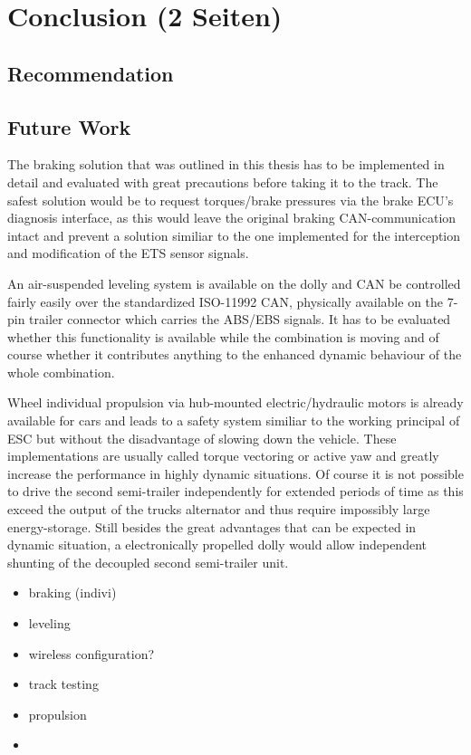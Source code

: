 \documentclass[ExampleMasters.tex]{subfiles}
\begin{document}
\clearpage
{\pagestyle{empty}\cleardoublepage}%
\chapter{Conclusion (2 Seiten)}
\label{chap:conclusion}

\section{Recommendation}
\label{sec:recommendation}



\section{Future Work}
\label{sec:future_work}

The braking solution that was outlined in this thesis has to be implemented in detail and evaluated with great  precautions before taking it to the track. The safest solution would be to request torques/brake pressures via the brake \gls{ECU}'s diagnosis interface, as this would leave the original braking CAN-communication intact and prevent a solution similiar to the one implemented for the interception and modification of the \gls{ETS} sensor signals. 

An air-suspended leveling system is available on the dolly and \gls{CAN} be controlled fairly easily over the standardized ISO-11992 CAN, physically available on the 7-pin trailer connector which carries the \gls{ABS}/\gls{EBS} signals. It has to be evaluated whether this functionality is available while the combination is moving and of course whether it contributes anything to the enhanced dynamic behaviour of the whole combination.

Wheel individual propulsion via hub-mounted electric/hydraulic motors is already available for cars and leads to a safety system similiar to the working principal of \gls{ESC} but without the disadvantage of slowing down the vehicle. These implementations are usually called torque vectoring or active yaw and greatly increase the performance in highly dynamic situations. Of course it is not possible to drive the second semi-trailer independently for extended periods of time as this exceed the output of the trucks alternator and thus require impossibly large energy-storage. Still besides the great advantages that can be expected in dynamic situation, a electronically propelled dolly would allow independent shunting of the decoupled second semi-trailer unit.



\begin{itemize}
	\item braking (indivi)
	\item leveling
	\item wireless configuration?
	\item track testing
	\item propulsion
	\item 
\end{itemize}
\end{document}
